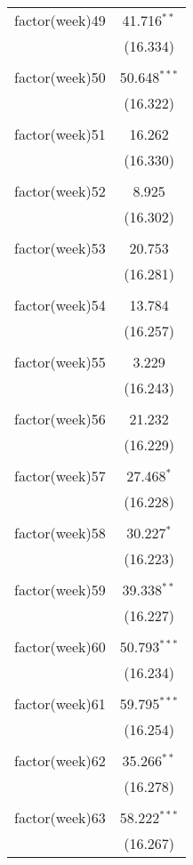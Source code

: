 \documentclass{article}
\begin{document}
\begin{table}[!htbp]
\begin{tabular}{@{\extracolsep{5pt}}lc}
 factor(week)49 & 41.716$^{**}$ \\ 
  & (16.334) \\ 
  & \\ 
 factor(week)50 & 50.648$^{***}$ \\ 
  & (16.322) \\ 
  & \\ 
 factor(week)51 & 16.262 \\ 
  & (16.330) \\ 
  & \\ 
 factor(week)52 & 8.925 \\ 
  & (16.302) \\ 
  & \\ 
 factor(week)53 & 20.753 \\ 
  & (16.281) \\ 
  & \\ 
 factor(week)54 & 13.784 \\ 
  & (16.257) \\ 
  & \\ 
 factor(week)55 & 3.229 \\ 
  & (16.243) \\ 
  & \\ 
 factor(week)56 & 21.232 \\ 
  & (16.229) \\ 
  & \\ 
 factor(week)57 & 27.468$^{*}$ \\ 
  & (16.228) \\ 
  & \\ 
 factor(week)58 & 30.227$^{*}$ \\ 
  & (16.223) \\ 
  & \\ 
 factor(week)59 & 39.338$^{**}$ \\ 
  & (16.227) \\ 
  & \\ 
 factor(week)60 & 50.793$^{***}$ \\ 
  & (16.234) \\ 
  & \\ 
 factor(week)61 & 59.795$^{***}$ \\ 
  & (16.254) \\ 
  & \\ 
 factor(week)62 & 35.266$^{**}$ \\ 
  & (16.278) \\ 
  & \\ 
 factor(week)63 & 58.222$^{***}$ \\ 
  & (16.267) \\ 

\end{tabular}
\end{table}
\end{document}
